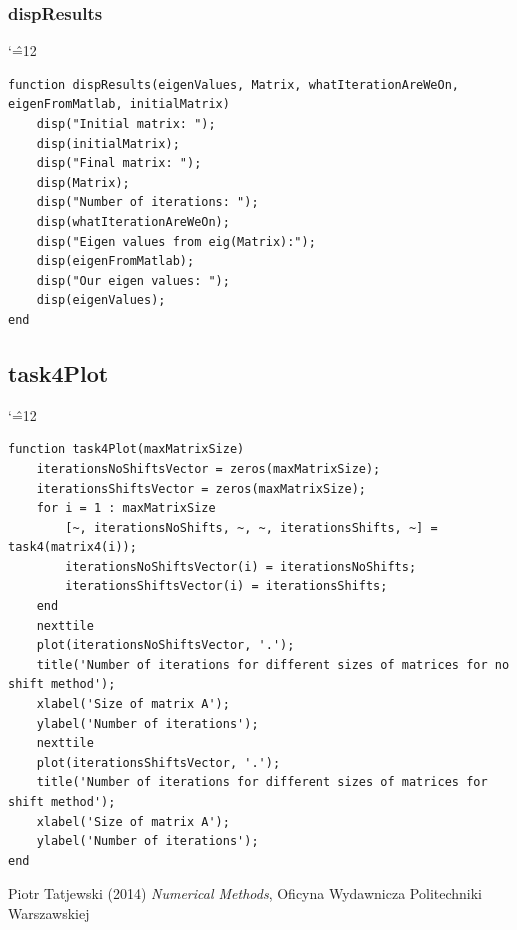 \documentclass[12pt]{report}
\newenvironment{simplechar}{%
   \catcode`\^=12
}{}
\begin{document}
\subsubsection{dispResults}
\begin{simplechar}
\begin{lstlisting}
function dispResults(eigenValues, Matrix, whatIterationAreWeOn, eigenFromMatlab, initialMatrix)
    disp("Initial matrix: ");
    disp(initialMatrix);
    disp("Final matrix: ");
    disp(Matrix);
    disp("Number of iterations: ");
    disp(whatIterationAreWeOn);
    disp("Eigen values from eig(Matrix):");
    disp(eigenFromMatlab);
    disp("Our eigen values: ");
    disp(eigenValues);
end
\end{lstlisting}
\end{simplechar}

\newpage
\hypertarget{function4}{\subsection{task4Plot}}
\begin{simplechar}
\begin{lstlisting}
function task4Plot(maxMatrixSize)
    iterationsNoShiftsVector = zeros(maxMatrixSize);
    iterationsShiftsVector = zeros(maxMatrixSize);
    for i = 1 : maxMatrixSize
        [~, iterationsNoShifts, ~, ~, iterationsShifts, ~] = task4(matrix4(i));
        iterationsNoShiftsVector(i) = iterationsNoShifts;
        iterationsShiftsVector(i) = iterationsShifts;
    end
    nexttile
    plot(iterationsNoShiftsVector, '.');
    title('Number of iterations for different sizes of matrices for no shift method');
    xlabel('Size of matrix A');
    ylabel('Number of iterations');
    nexttile
    plot(iterationsShiftsVector, '.');
    title('Number of iterations for different sizes of matrices for shift method');
    xlabel('Size of matrix A');
    ylabel('Number of iterations');
end
\end{lstlisting}
\end{simplechar}


\begin{thebibliography}{9}
Piotr Tatjewski (2014) \emph{Numerical Methods}, Oficyna Wydawnicza Politechniki Warszawskiej
\end{thebibliography}
\end{document}
